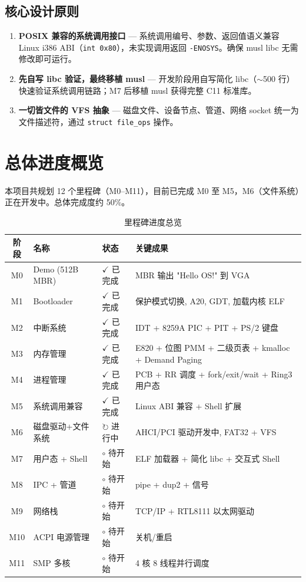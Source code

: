 \documentclass[12pt,a4paper]{article}
\newcommand{\statusdone}{\textcolor{done}{$\checkmark$ 已完成}}
\newcommand{\statuswip}{\textcolor{inprogress}{$\circlearrowright$ 进行中}}
\newcommand{\statuspending}{\textcolor{pending}{$\circ$ 待开始}}
\begin{document}
\subsection{核心设计原则}

\begin{enumerate}
    \item[\textbf{原则 A}] \textbf{POSIX 兼容的系统调用接口} --- 系统调用编号、参数、返回值语义兼容 Linux i386 ABI（\texttt{int 0x80}），未实现调用返回 \texttt{-ENOSYS}。确保 musl libc 无需修改即可运行。
    \item[\textbf{原则 B}] \textbf{先自写 libc 验证，最终移植 musl} --- 开发阶段用自写简化 libc（$\sim$500 行）快速验证系统调用链路；M7 后移植 musl 获得完整 C11 标准库。
    \item[\textbf{原则 C}] \textbf{一切皆文件的 VFS 抽象} --- 磁盘文件、设备节点、管道、网络 socket 统一为文件描述符，通过 \texttt{struct file\_ops} 操作。
\end{enumerate}

\section{总体进度概览}

本项目共规划 12 个里程碑（M0--M11），目前已完成 M0 至 M5，M6（文件系统）正在开发中。总体完成度约 50\%。

\begin{table}[h]
\centering
\begin{tabular}{cllp{6cm}}
\toprule
\textbf{阶段} & \textbf{名称} & \textbf{状态} & \textbf{关键成果} \\
\midrule
M0 & Demo (512B MBR) & \statusdone & MBR 输出 "Hello OS!" 到 VGA \\
M1 & Bootloader       & \statusdone & 保护模式切换, A20, GDT, 加载内核 ELF \\
M2 & 中断系统         & \statusdone & IDT + 8259A PIC + PIT + PS/2 键盘 \\
M3 & 内存管理         & \statusdone & E820 + 位图 PMM + 二级页表 + kmalloc + Demand Paging \\
M4 & 进程管理         & \statusdone & PCB + RR 调度 + fork/exit/wait + Ring3 用户态 \\
M5 & 系统调用兼容     & \statusdone & Linux ABI 兼容 + Shell 扩展 \\
\addlinespace
M6 & 磁盘驱动+文件系统 & \statuswip & AHCI/PCI 驱动开发中, FAT32 + VFS \\
M7 & 用户态 + Shell    & \statuspending & ELF 加载器 + 简化 libc + 交互式 Shell \\
M8 & IPC + 管道        & \statuspending & pipe + dup2 + 信号 \\
M9 & 网络栈            & \statuspending & TCP/IP + RTL8111 以太网驱动 \\
M10 & ACPI 电源管理    & \statuspending & 关机/重启 \\
M11 & SMP 多核         & \statuspending & 4 核 8 线程并行调度 \\
\bottomrule
\end{tabular}
\caption{里程碑进度总览}
\end{table}
\end{document}
